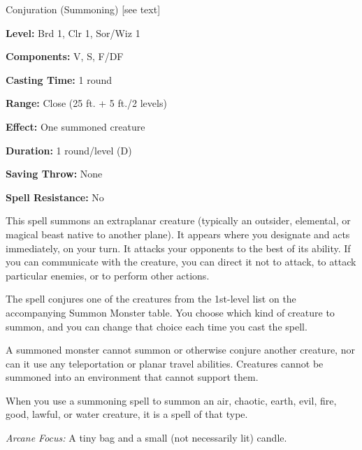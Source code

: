 
Conjuration (Summoning) [see text]

\textbf{Level:} Brd 1, Clr 1, Sor/Wiz 1

\textbf{Components:} V, S, F/DF

\textbf{Casting Time:} 1 round

\textbf{Range:} Close (25 ft. + 5 ft./2 levels)

\textbf{Effect:} One summoned creature

\textbf{Duration:} 1 round/level (D)

\textbf{Saving Throw:} None

\textbf{Spell Resistance:} No

This spell summons an extraplanar creature (typically an outsider, elemental, or 
magical beast native to another plane). It appears where you designate and acts 
immediately, on your turn. It attacks your opponents to the best of its ability. 
If you can communicate with the creature, you can direct it not to attack, to attack 
particular enemies, or to perform other actions.

The spell conjures one of the creatures from the 1st-level list on the accompanying 
Summon Monster table. You choose which kind of creature to summon, and you can 
change that choice each time you cast the spell.

A summoned monster cannot summon or otherwise conjure another creature, nor can 
it use any teleportation or planar travel abilities. Creatures cannot be summoned 
into an environment that cannot support them.

When you use a summoning spell to summon an air, chaotic, earth, evil, fire, good, 
lawful, or water creature, it is a spell of that type.

\textit{Arcane Focus:} A tiny bag and a small (not necessarily lit) candle.

